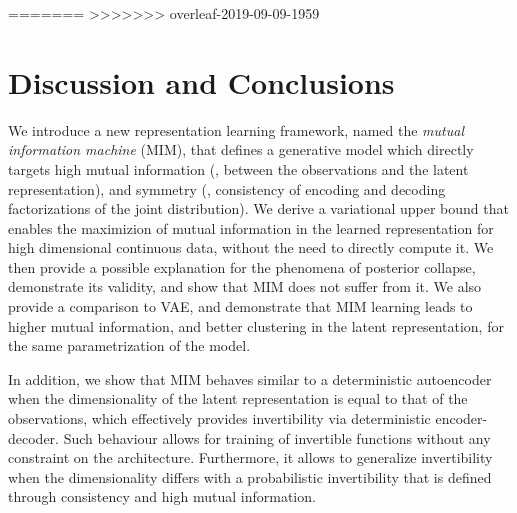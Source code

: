 

=======
>>>>>>> overleaf-2019-09-09-1959

\section{Discussion and Conclusions} \label{sec:conclusion}


We introduce a new representation learning framework, named the {\em mutual information machine} (MIM), that defines a generative model which directly targets high mutual information (\ie, between the observations and the latent representation), and symmetry (\ie, consistency of encoding and decoding factorizations of the joint distribution). We derive a variational upper bound that enables the maximizion of mutual information in the learned representation for high dimensional continuous data, without the need to directly compute it. We then provide a possible explanation for the phenomena of posterior collapse, demonstrate  its validity, and show that MIM does not suffer from it. We also provide a comparison to VAE, and demonstrate that MIM learning leads to higher mutual information, and better clustering in the latent representation, for the same parametrization of the model. 

In addition, we show that MIM behaves similar to a deterministic autoencoder when the dimensionality of the latent representation is equal to that of the observations, which effectively provides invertibility via deterministic encoder-decoder. Such behaviour allows for training of invertible functions without any constraint on the architecture. Furthermore, it allows to generalize invertibility when the dimensionality differs with a probabilistic invertibility that is defined through consistency and high mutual information.

